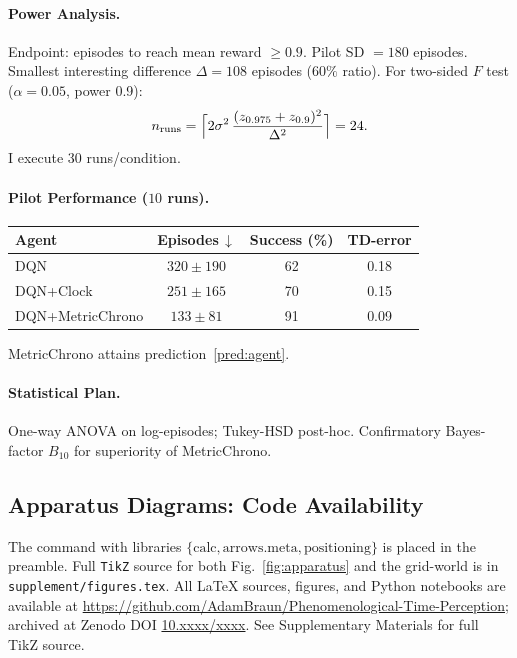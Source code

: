 \documentclass[11pt]{article}
\begin{document}
\paragraph{Power Analysis.}
Endpoint: episodes to reach mean reward $\ge 0.9$.
Pilot SD $=180$ episodes.  Smallest interesting difference
$\Delta=108$ episodes ($60\%$ ratio).  For two-sided
$F$ test ($\alpha=0.05$, power 0.9):
\[
n_{\mathrm{runs}}=\Bigl\lceil
    2\sigma^2 \,
    \frac{(z_{0.975}+z_{0.9})^2}{\Delta^2}
\Bigr\rceil = 24.
\]
I execute 30 runs/condition.

\paragraph{Pilot Performance ($10$ runs).}
\begin{center}
\begin{tabular}{lccc}
\toprule
Agent & Episodes\,$\downarrow$ & Success (\%) & TD-error \\
\midrule
DQN & $320\pm190$ & 62 & 0.18 \\
DQN+Clock & $251\pm165$ & 70 & 0.15 \\
DQN+MetricChrono & $133\pm81$ & 91 & 0.09 \\
\bottomrule
\end{tabular}
\end{center}
MetricChrono attains prediction~\ref{pred:agent}.

\paragraph{Statistical Plan.}
One-way ANOVA on log-episodes; Tukey-HSD post-hoc.  Confirmatory
Bayes-factor $B_{10}$ for superiority of MetricChrono.

\subsection{Apparatus Diagrams: Code Availability}
The command \texttt{\string\usetikzlibrary} with libraries \( \{\text{calc}, \text{arrows.meta}, \text{positioning}\} \) is placed in the preamble.  Full \texttt{TikZ} source for both
Fig.~\ref{fig:apparatus} and the grid-world is in
\texttt{supplement/figures.tex}. All \LaTeX{} sources, figures, and Python notebooks are available at \url{https://github.com/AdamBraun/Phenomenological-Time-Perception}; archived at Zenodo DOI \href{https://doi.org/10.xxxx/xxxx}{10.xxxx/xxxx}. See Supplementary Materials for full TikZ source.

\end{document}
